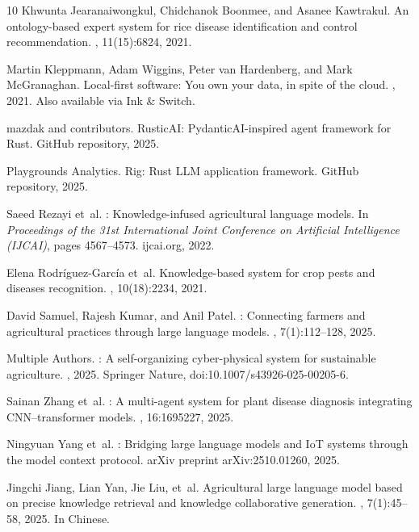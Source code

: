\documentclass[11pt,a4paper]{article}
\begin{document}
\begin{thebibliography}{10}
Khwunta Jearanaiwongkul, Chidchanok Boonmee, and Asanee Kawtrakul.
\newblock An ontology-based expert system for rice disease identification and
  control recommendation.
, 11(15):6824, 2021.

Martin Kleppmann, Adam Wiggins, Peter van Hardenberg, and Mark McGranaghan.
\newblock Local-first software: You own your data, in spite of the cloud.
, 2021.
\newblock Also available via Ink \& Switch.

mazdak and contributors.
\newblock Rustic{AI}: {PydanticAI}-inspired agent framework for {Rust}.
\newblock GitHub repository, 2025.

{Playgrounds Analytics}.
\newblock Rig: {Rust} {LLM} application framework.
\newblock GitHub repository, 2025.

Saeed Rezayi et~al.
: Knowledge-infused agricultural language models.
\newblock In {\em Proceedings of the 31st International Joint Conference on
  Artificial Intelligence (IJCAI)}, pages 4567--4573. ijcai.org, 2022.

Elena Rodr{\'i}guez-Garc{\'i}a et~al.
\newblock Knowledge-based system for crop pests and diseases recognition.
, 10(18):2234, 2021.

David Samuel, Rajesh Kumar, and Anil Patel.
: Connecting farmers and agricultural practices through
  large language models.
, 7(1):112--128, 2025.

Multiple Authors.
: A self-organizing cyber-physical system for sustainable
  agriculture.
, 2025.
\newblock Springer Nature, doi:10.1007/s43926-025-00205-6.

Sainan Zhang et~al.
: A multi-agent system for plant disease diagnosis
  integrating {CNN}--transformer models.
, 16:1695227, 2025.

Ningyuan Yang et~al.
: Bridging large language models and {IoT} systems through
  the model context protocol.
\newblock arXiv preprint arXiv:2510.01260, 2025.

Jingchi Jiang, Lian Yan, Jie Liu, et~al.
\newblock Agricultural large language model based on precise knowledge
  retrieval and knowledge collaborative generation.
, 7(1):45--58, 2025.
\newblock In Chinese.


\end{thebibliography}
\end{document}
